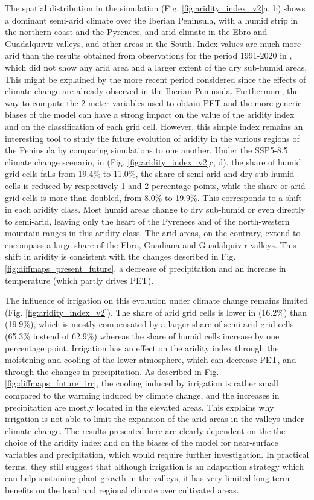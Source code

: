 The spatial distribution in the \presnoirr simulation (Fig. \ref{fig:aridity_index_v2}a, b) shows a dominant semi-arid climate over the Iberian Peninsula, with a humid strip in the northern coast and the Pyrenees, and arid climate in the Ebro and Guadalquivir valleys, and other areas in the South.
Index values are much more arid than the results obtained from observations for the period 1991-2020 in \citet{begueria_aridity_2025}, which did not show any arid area and a larger extent of the dry sub-humid areas. This might be explained by the more recent period considered since the effects of climate change are already observed in the Iberian Peninsula.
Furthermore, the way to compute the 2-meter variables used to obtain PET and the more generic biases of the model can have a strong impact on the value of the aridity index and on the classification of each grid cell. However, this simple index remains an interesting tool to study the future evolution of aridity in the various regions of the Peninsula by comparing simulations to one another.
Under the SSP5-8.5 climate change scenario, in \futnoirr (Fig. \ref{fig:aridity_index_v2}c, d), the share of humid grid cells falls from 19.4\% to 11.0\%, the share of semi-arid and dry sub-humid cells is reduced by respectively 1 and 2 percentage points, while the share or arid grid cells is more than doubled, from 8.0\% to 19.9\%. This corresponds to a shift in each aridity class. Most humid areas change to dry sub-humid or even directly to semi-arid, leaving only the heart of the Pyrenees and of the north-western mountain ranges in this aridity class. The arid areas, on the contrary, extend to encompass a large share of the Ebro, Guadiana and Guadalquivir valleys. This shift in aridity is consistent with the changes described in Fig. \ref{fig:diffmaps_present_future}, a decrease of precipitation and an increase in temperature (which partly drives PET).

The influence of irrigation on this evolution under climate change remains limited (Fig. \ref{fig:aridity_index_v2}). The share of arid grid cells is lower in \futirr (16.2\%) than \futnoirr (19.9\%), which is mostly compensated by a larger share of semi-arid grid cells (65.3\% instead of 62.9\%) whereas the share of humid cells increase by one percentage point. Irrigation has an effect on the aridity index through the moistening and cooling of the lower atmosphere, which can decrease PET, and through the changes in precipitation. As described in Fig. \ref{fig:diffmaps_future_irr}, the cooling induced by irrigation is rather small compared to the warming induced by climate change, and the increases in precipitation are mostly located in the elevated areas. This explains why irrigation is not able to limit the expansion of the arid areas in the valleys under climate change.
The results presented here are clearly dependent on the the choice of the aridity index and on the biases of the model for near-surface variables and precipitation, which would require further investigation. In practical terms, they still suggest that although irrigation is an adaptation strategy which can help sustaining plant growth in the valleys, it has very limited long-term benefits on the local and regional climate over cultivated areas.


